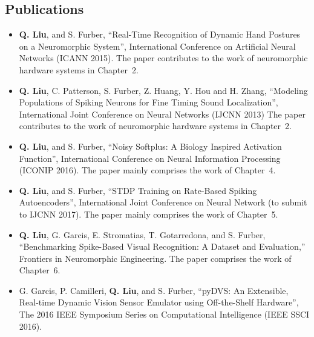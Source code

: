 \subsection{Publications}
\begin{itemize}
	\item 
	\textbf{Q. Liu}, and S. Furber, “Real-Time Recognition of Dynamic Hand Postures on a Neuromorphic System”, International Conference on Artificial Neural Networks (ICANN 2015).
	The paper contributes to the work of neuromorphic hardware systems in Chapter~2.
	
	\item
	\textbf{Q. Liu}, C. Patterson, S. Furber, Z. Huang, Y. Hou and H. Zhang, “Modeling Populations of Spiking Neurons for Fine Timing Sound Localization”, International Joint Conference on Neural Networks (IJCNN 2013)
	The paper contributes to the work of neuromorphic hardware systems in Chapter~2.
	
	\item 
	\textbf{Q. Liu}, and S. Furber, “Noisy Softplus: A Biology Inspired Activation Function”, International Conference on Neural Information Processing (ICONIP 2016). 
	The paper mainly comprises the work of Chapter~4.
	
	
	\item 
	\textbf{Q. Liu}, and S. Furber, “STDP Training on Rate-Based Spiking Autoencoders”, International Joint Conference on Neural Network (to submit to IJCNN 2017).
	The paper mainly comprises the work of Chapter~5.
	
	\item 
	\textbf{Q. Liu}, G. Garcis, E. Stromatias, T. Gotarredona, and S. Furber, “Benchmarking Spike-Based Visual Recognition: A Dataset and Evaluation,” Frontiers in Neuromorphic Engineering.
	The paper comprises the work of Chapter~6.
	

	\item 
	G. Garcis, P. Camilleri, \textbf{Q. Liu}, and S. Furber, “pyDVS: An Extensible, Real-time Dynamic Vision Sensor Emulator using Off-the-Shelf Hardware”, The 2016 IEEE Symposium Series on Computational Intelligence (IEEE SSCI 2016).
	
	
\end{itemize}	

